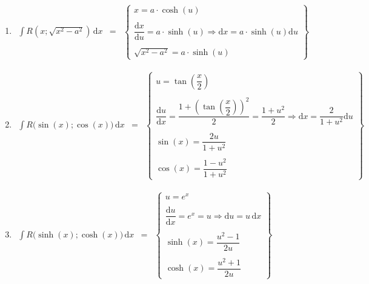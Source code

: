 \begin{enumerate}[$(a)$]
\item $\begin{array}{lll}\displaystyle \int R\left(x;\sqrt{x^2-a^2}\right)\,\text{d}x&=&\left\{\begin{matrix}x=a\cdot \cosh\left(u\right)\\\\\dfrac{\text{d}x}{\text{d}u}=a\cdot \sinh\left(u\right)\Rightarrow \text{d}x=a\cdot \sinh\left(u\right)\text{d}u\\\\\sqrt{x^2-a^2}=a\cdot \sinh\left(u\right)\end{matrix}\right\}\end{array}$
\item $\begin{array}{lll}\displaystyle \int R\Big(\sin\left(x\right); \cos\left(x\right)\Big)\,\text{d}x&=&\left\{\begin{matrix}u=\tan\left(\dfrac{x}{2}\right)\\\\\dfrac{\text{d}u}{\text{d}x}=\dfrac{1+\left(\tan\left(\dfrac{x}{2}\right)\right)^2}{2}=\dfrac{1+u^2}{2}\Rightarrow \text{d}x=\dfrac{2}{1+u^2}\text{d}u\\\\\sin\left(x\right)=\dfrac{2u}{1+u^2}\\\\\cos\left(x\right)=\dfrac{1-u^2}{1+u^2}\end{matrix}\right\}\end{array}$
\item $\begin{array}{lll}\displaystyle \int R\Big(\sinh\left(x\right); \cosh\left(x\right)\Big)\,\text{d}x&=&\left\{\begin{matrix}u=e^x\\\\\dfrac{\text{d}u}{\text{d}x}=e^x=u\Rightarrow \text{d}u=u\,\text{d}x\\\\\sinh\left(x\right)=\dfrac{u^2-1}{2u}\\\\\cosh\left(x\right)=\dfrac{u^2+1}{2u}\end{matrix}\right\}\end{array}$
\end{enumerate}
